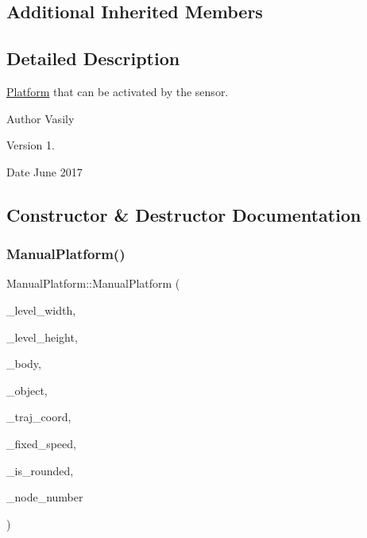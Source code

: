 \subsection*{Additional Inherited Members}


\subsection{Detailed Description}
\hyperlink{class_platform}{Platform} that can be activated by the sensor. 

\begin{DoxyAuthor}{Author}
Vasily 
\end{DoxyAuthor}
\begin{DoxyVersion}{Version}
1. 
\end{DoxyVersion}
\begin{DoxyDate}{Date}
June 2017 
\end{DoxyDate}


\subsection{Constructor \& Destructor Documentation}
\mbox{\label{class_manual_platform_a72aef4e3ecab2a802e09dfcc89e1f8e4}} 
\subsubsection{\texorpdfstring{Manual\+Platform()}{ManualPlatform()}}
{\footnotesize\ttfamily Manual\+Platform\+::\+Manual\+Platform (\begin{DoxyParamCaption}\item[{int}]{\+\_\+level\+\_\+width,  }\item[{int}]{\+\_\+level\+\_\+height,  }\item[{b2\+Body $\ast$}]{\+\_\+body,  }\item[{\hyperlink{class_object}{Object} $\ast$}]{\+\_\+object,  }\item[{std\+::vector$<$ std\+::pair$<$ double, double $>$$>$}]{\+\_\+traj\+\_\+coord,  }\item[{int}]{\+\_\+fixed\+\_\+speed,  }\item[{bool}]{\+\_\+is\+\_\+rounded,  }\item[{int}]{\+\_\+node\+\_\+number }\end{DoxyParamCaption})}



